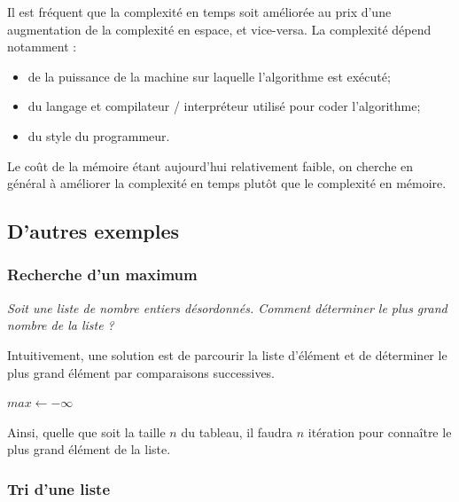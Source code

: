 \documentclass[11pt,oneside]{article}
\begin{document}
Il est fréquent que la complexité en temps soit améliorée au prix d'une augmentation de la complexité en espace, et vice-versa.
La complexité dépend notamment :
\begin{itemize}
\item de la puissance de la machine sur laquelle l'algorithme est exécuté;
\item du langage et compilateur / interpréteur utilisé pour coder l'algorithme;
\item du style du programmeur.
\end{itemize}


\begin{rem}
Le coût de la mémoire étant aujourd'hui relativement faible, on cherche en général à améliorer la complexité en temps plutôt que le complexité en mémoire. 
\end{rem}

\subsection{D'autres exemples}
\subsubsection{Recherche d'un maximum}
\begin{exemple}
\textit{Soit une liste de nombre entiers désordonnés. Comment déterminer le plus grand nombre de la liste ?}

Intuitivement, une solution est de parcourir la liste d'élément et de déterminer le plus grand élément par comparaisons successives.


\begin{pseudo}
\begin{algorithm}[H]
$max  \leftarrow -\infty$\\
\end{algorithm}
\end{pseudo}

Ainsi, quelle que soit la taille $n$ du tableau, il faudra $n$ itération pour connaître le plus grand élément de la liste. 
\end{exemple}

\subsubsection{Tri d'une liste}
\end{document}
